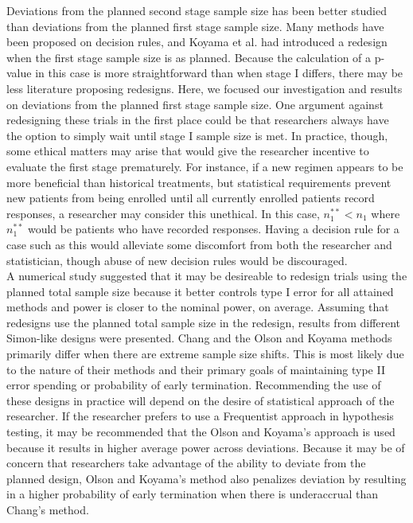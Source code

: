 \documentclass[12pt]{report}\usepackage[]{graphicx}\usepackage[]{color}
\newlength{\li}\setlength{\li}{14.48pt}
\newlength{\di}\setlength{\di}{-3.5mm}
\begin{document}
Deviations from the planned second stage sample size has been better studied than deviations from the planned first stage sample size. Many methods have been proposed on decision rules, and Koyama et al. had introduced a redesign when the first stage sample size is as planned. Because the calculation of a p-value in this case is more straightforward than when stage I differs, there may be less literature proposing redesigns. Here, we focused our investigation and results on deviations from the planned first stage sample size. One argument against redesigning these trials in the first place could be that researchers always have the option to simply wait until stage I sample size is met. In practice, though, some ethical matters may arise that would give the researcher incentive to evaluate the first stage prematurely. For instance, if a new regimen appears to be more beneficial than historical treatments, but statistical requirements prevent new patients from being enrolled until all currently enrolled patients record responses, a researcher may consider this unethical. In this case, $n_1^{\ast\ast} < n_1$ where $n_1^{\ast\ast}$ would be patients who have recorded responses. Having a decision rule for a case such as this would alleviate some discomfort from both the researcher and statistician, though abuse of new decision rules would be discouraged. \\
\indent A numerical study suggested that it may be desireable to redesign trials using the planned total sample size because it better controls type I error for all attained methods and power is closer to the nominal power, on average. Assuming that redesigns use the planned total sample size in the redesign, results from different Simon-like designs were presented.  Chang and the Olson and Koyama methods primarily differ when there are extreme sample size shifts. This is most likely due to the nature of their methods and their primary goals of maintaining type II error spending or probability of early termination. Recommending the use of these designs in practice will depend on the desire of statistical approach of the researcher. If the researcher prefers to use a Frequentist approach in hypothesis testing, it may be recommended that the Olson and Koyama's approach is used because it results in higher average power across deviations. Because it may be of concern that researchers take advantage of the ability to deviate from the planned design, Olson and Koyama's method also penalizes deviation by resulting in a higher probability of early termination when there is underaccrual than Chang's method. \\
\end{document}

